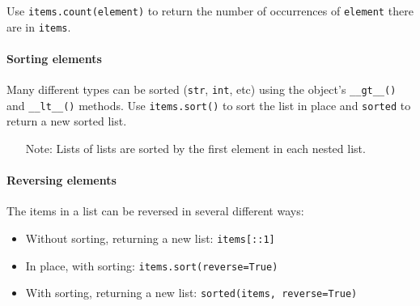 Use \texttt{items.count(element)} to return the number of occurrences of \texttt{element} there are in \texttt{items}.

\paragraph{Sorting elements}\label{par:sorting_elements}

Many different types can be sorted (\texttt{str}, \texttt{int}, etc) using the object's \texttt{__gt__()} and \texttt{__lt__()} methods.
Use \texttt{items.sort()} to sort the list in place and \texttt{sorted} to return a new sorted list.

\begin{note}
	\begin{itemize}
		\item[Note:] Lists of lists are sorted by the first element in each nested list.
	\end{itemize}
\end{note}

\paragraph{Reversing elements}\label{par:reversing_elements}

The items in a list can be reversed in several different ways:

\begin{itemize}
	\item Without sorting, returning a new list: \texttt{items[::1]}
	\item In place, with sorting: \texttt{items.sort(reverse=True)}
	\item With sorting, returning a new list: \texttt{sorted(items, reverse=True)}
\end{itemize}

